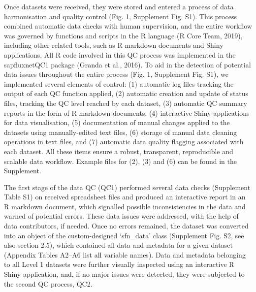 \documentclass[11pt,twoside]{reedthesis}
\begin{document}
Once datasets were received, they were stored and entered a process of
data harmonisation and quality control (Fig. 1, Supplement Fig. S1).
This process combined automatic data checks with human supervision, and
the entire workflow was governed by functions and scripts in the R
language (R Core Team, 2019), including other related tools, such as R
markdown documents and Shiny applications. All R code involved in this
QC process was implemented in the sapfluxnetQC1 package (Granda et al.,
2016). To aid in the detection of potential data issues throughout the
entire process (Fig. 1, Supplement Fig. S1), we implemented several
elements of control: (1) automatic log files tracking the output of each
QC function applied, (2) automatic creation and update of status files,
tracking the QC level reached by each dataset, (3) automatic QC summary
reports in the form of R markdown documents, (4) interactive Shiny
applications for data visualisation, (5) documentation of manual changes
applied to the datasets using manually-edited text files, (6) storage of
manual data cleaning operations in text files, and (7) automatic data
quality flagging associated with each dataset. All these items ensure a
robust, transparent, reproducible and scalable data workflow. Example
files for (2), (3) and (6) can be found in the Supplement.\par

The first stage of the data QC (QC1) performed several data checks
(Supplement Table S1) on received spreadsheet files and produced an
interactive report in an R markdown document, which signalled possible
inconsistencies in the data and warned of potential errors. These data
issues were addressed, with the help of data contributors, if needed.
Once no errors remained, the dataset was converted into an object of the
custom-designed `sfn\_data' class (Supplement Fig. S2, see also section
2.5), which contained all data and metadata for a given dataset
(Appendix Tables A2--A6 list all variable names). Data and metadata
belonging to all Level 1 datasets were further visually inspected using
an interactive R Shiny application, and, if no major issues were
detected, they were subjected to the second QC process, QC2.\par
\end{document}
